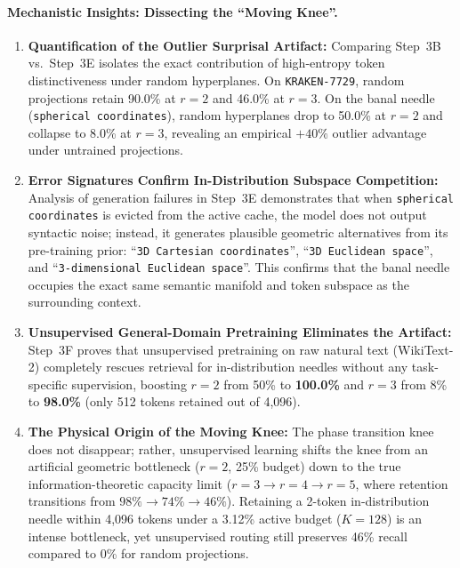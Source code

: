 \documentclass[11pt,a4paper]{article}
\begin{document}
\paragraph{Mechanistic Insights: Dissecting the ``Moving Knee''.}
\begin{enumerate}
    \item \textbf{Quantification of the Outlier Surprisal Artifact:} Comparing Step~3B vs.\ Step~3E isolates the exact contribution of high-entropy token distinctiveness under random hyperplanes. On \texttt{KRAKEN-7729}, random projections retain 90.0\% at $r=2$ and 46.0\% at $r=3$. On the banal needle (\texttt{spherical coordinates}), random hyperplanes drop to 50.0\% at $r=2$ and collapse to 8.0\% at $r=3$, revealing an empirical $+40\%$ outlier advantage under untrained projections.
    \item \textbf{Error Signatures Confirm In-Distribution Subspace Competition:} Analysis of generation failures in Step~3E demonstrates that when \texttt{spherical coordinates} is evicted from the active cache, the model does not output syntactic noise; instead, it generates plausible geometric alternatives from its pre-training prior: ``\texttt{3D Cartesian coordinates}'', ``\texttt{3D Euclidean space}'', and ``\texttt{3-dimensional Euclidean space}''. This confirms that the banal needle occupies the exact same semantic manifold and token subspace as the surrounding context.
    \item \textbf{Unsupervised General-Domain Pretraining Eliminates the Artifact:} Step~3F proves that unsupervised pretraining on raw natural text (WikiText-2) completely rescues retrieval for in-distribution needles without any task-specific supervision, boosting $r=2$ from 50\% to \textbf{100.0\%} and $r=3$ from 8\% to \textbf{98.0\%} (only 512 tokens retained out of 4{,}096).
    \item \textbf{The Physical Origin of the Moving Knee:} The phase transition knee does not disappear; rather, unsupervised learning shifts the knee from an artificial geometric bottleneck ($r=2$, 25\% budget) down to the true information-theoretic capacity limit ($r=3 \to r=4 \to r=5$, where retention transitions from $98\% \to 74\% \to 46\%$). Retaining a 2-token in-distribution needle within 4{,}096 tokens under a 3.12\% active budget ($K=128$) is an intense bottleneck, yet unsupervised routing still preserves 46\% recall compared to 0\% for random projections.
\end{enumerate}
\end{document}
